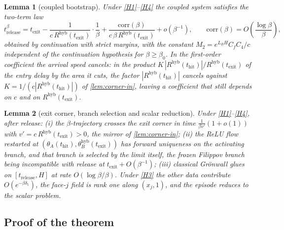 \documentclass[11pt]{article}
\newtheorem{lemma}[lemma]{Lemma}
\theoremstyle{definition}
\theoremstyle{remark}
\newcommand{\thit}{t_{\mathrm{hit}}}
\newcommand{\texit}{t_{\mathrm{exit}}}
\newcommand{\trel}{t_{\mathrm{release}}}
\newcommand{\hyb}{\mathrm{hyb}}
\begin{document}
\begin{lemma}[coupled bootstrap]\label{lem:bootstrap}
Under \eqref{H1}--\eqref{H4} the coupled system satisfies the two-term law
\begin{equation}\label{eq:twoterm}
t^\beta_{\mathrm{release}}
=\texit-\frac{1}{c\,R^{\hyb}(\texit)}\cdot\frac{1}{\beta}
+\frac{\mathrm{corr}(\beta)}{c\,\beta\,R^{\hyb}(\texit)}+o(\beta^{-1}),
\qquad \mathrm{corr}(\beta)=O\!\left(\frac{\log\beta}{\beta}\right),
\end{equation}
obtained by continuation with strict margins, with the constant
$M_2=e^{L_BH}C_fC_4/c$ independent of the continuation hypothesis for
$\beta\ge\beta_0$. In the first-order coefficient the arrival speed cancels: in
the product $K\,|R^{\hyb}(\thit)|/R^{\hyb}(\texit)$ of the entry delay by the
area it cuts, the factor $|R^{\hyb}(\thit)|$ cancels against
$K=1/(c|R^{\hyb}(\thit)|)$ of \cref{lem:corner-in}, leaving a coefficient that
still depends on $c$ and on $R^{\hyb}(\texit)$.
\end{lemma}

\begin{lemma}[exit corner, branch selection and scalar reduction]\label{lem:corner-out}
Under \eqref{H1}--\eqref{H4}, after release: (i) the $\beta$-trajectory crosses
the exit corner in time $\tfrac{1}{\beta v'}(1+o(1))$ with
$v'=c\,R^{\hyb}(\texit)>0$, the mirror of \cref{lem:corner-in}; (ii) the ReLU flow
restarted at $(\theta_A(\thit),\theta_B^{\hyb}(\texit))$ has forward uniqueness on
the activating branch, and that branch is selected by the limit itself, the
frozen Filippov branch~\cite{Fil88} being incompatible with release at
$\texit+O(\beta^{-1})$; (iii) classical Gr\"onwall glues on $[\trel,H]$ at rate
$O(\log\beta/\beta)$. Under \eqref{H3} the other data contribute
$O(e^{-\beta\delta_1})$, the face-$j$ field is rank one along $(x_j,1)$, and the
episode reduces to the scalar problem.
\end{lemma}

\subsection{Proof of the theorem}\label{sec:proofmain}
\end{document}

